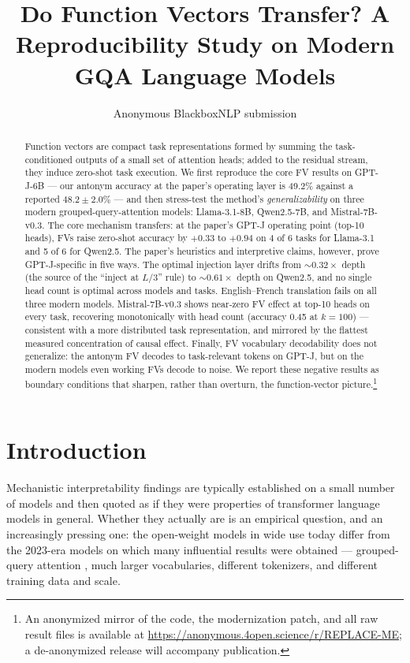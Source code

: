 \documentclass[11pt]{article}
\title{Do Function Vectors Transfer? A Reproducibility Study on Modern GQA Language Models}
\author{Anonymous BlackboxNLP submission}
\begin{document}
\maketitle

\begin{abstract}
Function vectors \citep[FVs;][]{todd2024function} are compact task
representations formed by summing the task-conditioned outputs of a small set
of attention heads; added to the residual stream, they induce zero-shot task
execution. We first reproduce the core FV results on GPT-J-6B --- our antonym
accuracy at the paper's operating layer is 49.2\% against a reported
$48.2 \pm 2.0\%$ --- and then stress-test the method's \emph{generalizability}
on three modern grouped-query-attention models: Llama-3.1-8B, Qwen2.5-7B, and
Mistral-7B-v0.3. The core mechanism transfers: at the paper's GPT-J
operating point (top-10 heads), FVs raise zero-shot accuracy by $+0.33$ to
$+0.94$ on 4 of 6 tasks for Llama-3.1 and 5 of 6 for Qwen2.5. The paper's
heuristics and interpretive claims, however, prove GPT-J-specific in five
ways. The optimal injection layer drifts from ${\sim}0.32\times$ depth (the
source of the ``inject at $L/3$'' rule) to ${\sim}0.61\times$ depth on
Qwen2.5, and no single head count is optimal across models and tasks.
English--French translation fails on all three modern models.
Mistral-7B-v0.3 shows near-zero FV effect at top-10 heads on every task,
recovering monotonically with head count (accuracy 0.45 at $k{=}100$) ---
consistent with a more distributed task representation, and mirrored by the
flattest measured concentration of causal effect. Finally, FV vocabulary
decodability does not generalize: the antonym FV decodes to task-relevant
tokens on GPT-J, but on the modern models even working FVs decode to noise.
We report these negative results as boundary conditions that sharpen,
rather than overturn, the function-vector
picture.\footnote{An anonymized mirror of the code, the modernization
patch, and all raw result files is available at
\url{https://anonymous.4open.science/r/REPLACE-ME}; a de-anonymized
release will accompany publication.
}
\end{abstract}

\section{Introduction}

Mechanistic interpretability findings are typically established on a small
number of models and then quoted as if they were properties of transformer
language models in general. Whether they actually are is an empirical
question, and an increasingly pressing one: the open-weight models in wide
use today differ from the 2023-era models on which many influential results
were obtained --- grouped-query attention \citep[GQA;][]{ainslie2023gqa},
much larger vocabularies, different tokenizers, and different training data
and scale.
\end{document}
